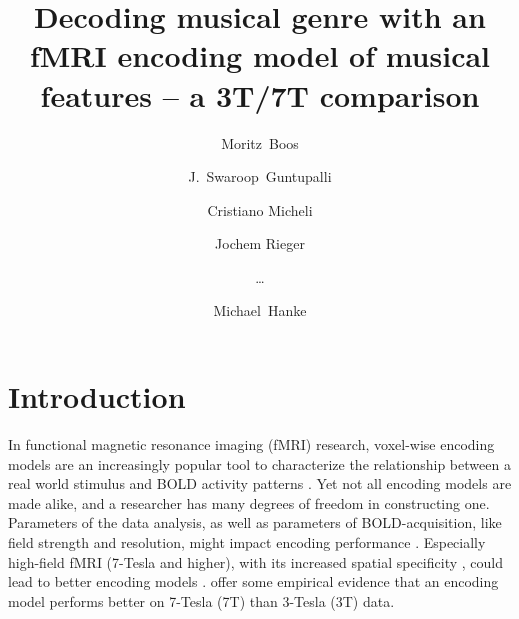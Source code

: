 



\title{Decoding musical genre with an fMRI encoding model of musical
features -- a 3T/7T comparison}


\author[1]{Moritz~Boos}
\author[2]{J.~Swaroop~Guntupalli}
\author[1]{Cristiano Micheli}
\author[1]{Jochem Rieger}
\author[0]{\ldots}
\author[3,4]{Michael~Hanke}

\maketitle
\thispagestyle{fancy}

\listoftodos

\begin{abstract}

\end{abstract}

\clearpage


\section*{Introduction}

In functional magnetic resonance imaging (f{MRI}) research, voxel-wise encoding
models are an increasingly popular tool to characterize the relationship
between a real world stimulus and BOLD activity patterns
\citep{NG11,TD+06,KG+08,SZ09}.  Yet not all encoding models are made alike, and
a researcher has many degrees of freedom in constructing one.  Parameters of
the data analysis, as well as parameters of BOLD-acquisition, like field
strength and resolution, might impact encoding performance \citep{KB07,FK12}.
Especially high-field f{MRI} (7-Tesla and higher), with its increased spatial
specificity \citep{THW+05,YU08}, could lead to better encoding models \citep{FK12}. 
\citet{SF14} offer some empirical evidence that an encoding model performs better on
7-Tesla (7T) than 3-Tesla (3T) data.

